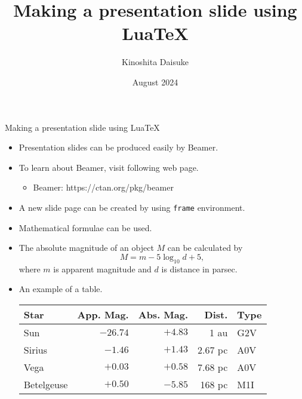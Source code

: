 \documentclass[t]{beamer}
\title{\bf Making a presentation slide using Lua\TeX}
\author{Kinoshita Daisuke}
\date{August 2024}
\begin{document}
\begin{frame}
 \titlepage
\end{frame}

\begin{frame}{Making a presentation slide using Lua\TeX}
 \begin{itemize}
  \item Presentation slides can be produced easily by Beamer.
  \item To learn about Beamer, visit following web page.
	\begin{itemize}
	 \item Beamer: https://ctan.org/pkg/beamer
	\end{itemize}
  \item A new slide page can be created by using {\tt frame}
	environment.
  \item Mathematical formulae can be used.
  \item The absolute magnitude of an object $M$ can be calculated by
	\[
	M = m - 5 \log_{10} d + 5,
	\]
	where $m$ is apparent magnitude and $d$ is distance in parsec.
  \item An example of a table.
	\begin{center}
	 \begin{tabular}{|l|r|r|r|l|}
	  \hline
	  Star & App. Mag. & Abs. Mag. & Dist. & Type \\
	  \hline \hline
	  Sun & $-26.74$ & $+4.83$ & 1 au & G2V \\
	  Sirius & $-1.46$ & $+1.43$ & 2.67 pc & A0V \\
	  Vega & $+0.03$ & $+0.58$ & 7.68 pc & A0V \\
	  Betelgeuse & $+0.50$ & $-5.85$ & 168 pc & M1I \\
	  \hline
	 \end{tabular}
	\end{center}
 \end{itemize}
\end{frame}
\end{document}
